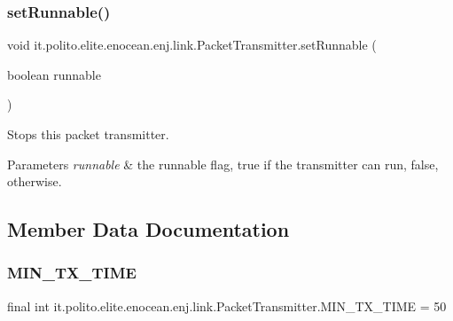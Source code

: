 \subsubsection{\texorpdfstring{set\+Runnable()}{setRunnable()}}
{\footnotesize\ttfamily void it.\+polito.\+elite.\+enocean.\+enj.\+link.\+Packet\+Transmitter.\+set\+Runnable (\begin{DoxyParamCaption}\item[{boolean}]{runnable }\end{DoxyParamCaption})}

Stops this packet transmitter. 
\begin{DoxyParams}{Parameters}
{\em runnable} & the runnable flag, true if the transmitter can run, false, otherwise. \\
\hline
\end{DoxyParams}


\subsection{Member Data Documentation}
\hypertarget{classit_1_1polito_1_1elite_1_1enocean_1_1enj_1_1link_1_1_packet_transmitter_ac6003ffc335863e2566a99792eb0f698}{}\label{classit_1_1polito_1_1elite_1_1enocean_1_1enj_1_1link_1_1_packet_transmitter_ac6003ffc335863e2566a99792eb0f698} 
\subsubsection{\texorpdfstring{M\+I\+N\+\_\+\+T\+X\+\_\+\+T\+I\+ME}{MIN\_TX\_TIME}}
{\footnotesize\ttfamily final int it.\+polito.\+elite.\+enocean.\+enj.\+link.\+Packet\+Transmitter.\+M\+I\+N\+\_\+\+T\+X\+\_\+\+T\+I\+ME = 50\hspace{0.3cm}{\ttfamily [static]}}

\hypertarget{classit_1_1polito_1_1elite_1_1enocean_1_1enj_1_1link_1_1_packet_transmitter_a24cb11c0399845b2a0f85dc1fd5e490e}{}\label{classit_1_1polito_1_1elite_1_1enocean_1_1enj_1_1link_1_1_packet_transmitter_a24cb11c0399845b2a0f85dc1fd5e490e} 
